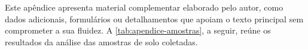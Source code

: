 \label{ap:exemplo-de-apendice}


Este apêndice apresenta material complementar elaborado pelo autor, como dados adicionais, formulários ou detalhamentos que apoiam o texto principal sem comprometer a sua fluidez. A \autoref{tab:apendice-amostras}, a seguir, reúne os resultados da análise das amostras de solo coletadas.

